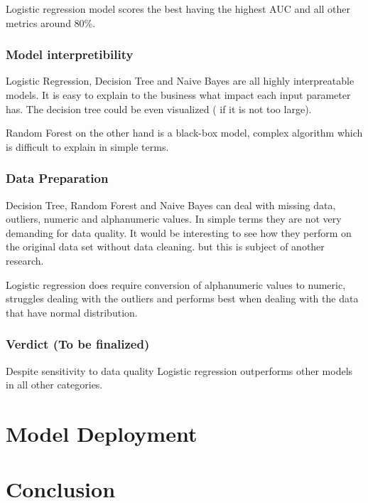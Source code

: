 Logistic regression model scores the best having the highest AUC and all
other metrics around 80\%.

\hypertarget{model-interpretibility}{%
\subsubsection{Model interpretibility}\label{model-interpretibility}}

Logistic Regression, Decision Tree and Naive Bayes are all highly
interpreatable models. It is easy to explain to the business what impact
each input parameter has. The decision tree could be even visualized (
if it is not too large).

Random Forest on the other hand is a black-box model, complex algorithm
which is difficult to explain in simple terms.

\hypertarget{data-preparation-1}{%
\subsubsection{Data Preparation}\label{data-preparation-1}}

Decision Tree, Random Forest and Naive Bayes can deal with missing data,
outliers, numeric and alphanumeric values. In simple terms they are not
very demanding for data quality. It would be interesting to see how they
perform on the original data set without data cleaning. but this is
subject of another research.

Logistic regression does require conversion of alphanumeric values to
numeric, struggles dealing with the outliers and performs best when
dealing with the data that have normal distribution.

\hypertarget{verdict-to-be-finalized}{%
\subsubsection{Verdict (To be
finalized)}\label{verdict-to-be-finalized}}

Despite sensitivity to data quality Logistic regression outperforms
other models in all other categories.

\hypertarget{model-deployment}{%
\section{Model Deployment}\label{model-deployment}}

\hypertarget{conclusion}{%
\section{Conclusion}\label{conclusion}}

